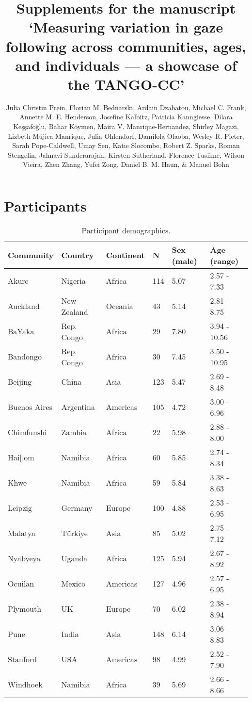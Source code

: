 \documentclass[
  man,floatsintext]{apa7}
\title{Supplements for the manuscript `Measuring variation in gaze following across communities, ages, and individuals --- a showcase of the TANGO-CC'}
\author{Julia Christin Prein\textsuperscript{}, Florian M. Bednarski\textsuperscript{}, Ardain Dzabatou\textsuperscript{}, Michael C. Frank\textsuperscript{}, Annette M. E. Henderson\textsuperscript{}, Josefine Kalbitz\textsuperscript{}, Patricia Kanngiesse\textsuperscript{}, Dilara Keşşafoğlu\textsuperscript{}, Bahar Köymen\textsuperscript{}, Maira V. Manrique-Hernandez\textsuperscript{}, Shirley Magazi\textsuperscript{}, Lizbeth Mújica-Manrique\textsuperscript{}, Julia Ohlendorf\textsuperscript{}, Damilola Olaoba\textsuperscript{}, Wesley R. Pieter\textsuperscript{}, Sarah Pope-Caldwell\textsuperscript{}, Umay Sen\textsuperscript{}, Katie Slocombe\textsuperscript{}, Robert Z. Sparks\textsuperscript{}, Roman Stengelin\textsuperscript{}, Jahnavi Sunderarajan\textsuperscript{}, Kirsten Sutherland\textsuperscript{}, Florence Tusiime\textsuperscript{}, Wilson Vieira\textsuperscript{}, Zhen Zhang\textsuperscript{}, Yufei Zong\textsuperscript{}, Daniel B. M. Haun\textsuperscript{}, \& Manuel Bohn\textsuperscript{}}
\date{}
\affiliation{\phantom{0}}
\begin{document}
\maketitle

\section{Participants}\label{participants}

\begin{table}

\caption{\label{tab:demtable}Participant demographics.}
\centering
\begin{tabular}[t]{llllll}
\toprule
Community & Country & Continent & N & Sex (male) & Age (range)\\
\midrule
Akure & Nigeria & Africa & 114 & 5.07 & 2.57  -  7.33\\
Auckland & New Zealand & Oceania & 43 & 5.14 & 2.81  -  8.75\\
BaYaka & Rep. Congo & Africa & 29 & 7.80 & 3.94  -  10.56\\
Bandongo & Rep. Congo & Africa & 30 & 7.45 & 3.50  -  10.95\\
Beijing & China & Asia & 123 & 5.47 & 2.69  -  8.48\\
\addlinespace
Buenos Aires & Argentina & Americas & 105 & 4.72 & 3.00  -  6.96\\
Chimfunshi & Zambia & Africa & 22 & 5.98 & 2.88  -  8.00\\
Hai||om & Namibia & Africa & 60 & 5.85 & 2.74  -  8.34\\
Khwe & Namibia & Africa & 59 & 5.84 & 3.38  -  8.63\\
Leipzig & Germany & Europe & 100 & 4.88 & 2.53  -  6.95\\
\addlinespace
Malatya & Türkiye & Asia & 85 & 5.02 & 2.75  -  7.12\\
Nyabyeya & Uganda & Africa & 125 & 5.94 & 2.67  -  8.92\\
Ocuilan & Mexico & Americas & 127 & 4.96 & 2.57  -  6.95\\
Plymouth & UK & Europe & 70 & 6.02 & 2.38  -  8.94\\
Pune & India & Asia & 148 & 6.14 & 3.06  -  8.83\\
\addlinespace
Stanford & USA & Americas & 98 & 4.99 & 2.52  -  7.90\\
Windhoek & Namibia & Africa & 39 & 5.69 & 2.66  -  8.66\\
\bottomrule
\end{tabular}
\end{table}
\end{document}
